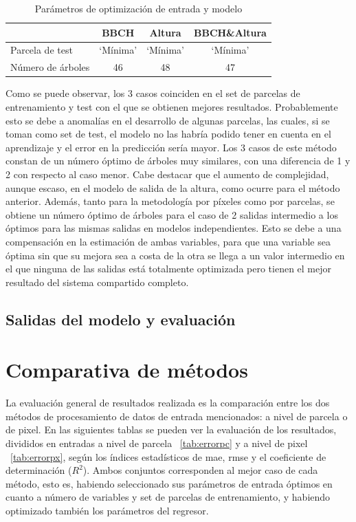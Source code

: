 \begin{table}[h]
\centering
\begin{tabular}{l|ccc}
                  & BBCH     & Altura   & BBCH\&Altura \\ \hline
Parcela de test   & `Mínima' & `Mínima' & `Mínima'     \\
Número de árboles & 46       & 48       & 47          
\end{tabular}
\caption{Parámetros de optimización de entrada y modelo \label{tab:opt_pixl}}
\end{table}

\par Como se puede observar, los 3 casos coinciden en el set de parcelas de entrenamiento y test con el que se obtienen mejores resultados. Probablemente esto se debe a anomalías en el desarrollo de algunas parcelas, las cuales, si se toman como set de test, el modelo no las habría podido tener en cuenta en el aprendizaje y el error en la predicción sería mayor. Los 3 casos de este método constan de un número óptimo de árboles muy similares, con una diferencia de 1 y 2 con respecto al caso menor. Cabe destacar que el aumento de complejidad, aunque escaso, en el modelo de salida de la altura, como ocurre para el método anterior. Además, tanto para la metodología por píxeles como por parcelas, se obtiene un número óptimo de árboles para el caso de 2 salidas intermedio a los óptimos para las mismas salidas en modelos independientes. Esto se debe a una compensación en la estimación de ambas variables, para que una variable sea óptima sin que su mejora sea a costa de la otra se llega a un valor intermedio en el que ninguna de las salidas está totalmente optimizada pero tienen el mejor resultado del sistema compartido completo. 


\subsection{Salidas del modelo y evaluación}
\section{Comparativa de métodos}
\par La evaluación general de resultados realizada es la comparación entre los dos métodos de procesamiento de datos de entrada mencionados: a nivel de parcela o de pixel. En las siguientes tablas se pueden ver la evaluación de los resultados, divididos en entradas a nivel de parcela ~\ref{tab:errorpc} y a nivel de pixel ~\ref{tab:errorpx}, según los índices estadísticos de \gls{mae}, \gls{rmse} y el coeficiente de determinación ($R^2$). Ambos conjuntos corresponden al mejor caso de cada método, esto es, habiendo seleccionado sus parámetros de entrada óptimos en cuanto a número de variables y set de parcelas de entrenamiento, y habiendo optimizado también los parámetros del regresor.

